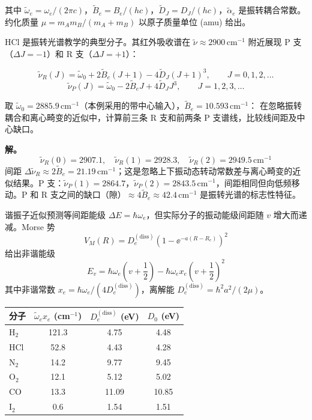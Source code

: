 其中 \(\tilde\omega_e=\omega_e/(2\pi c)\)，\(\tilde B_e=B_e/(hc)\)，\(\tilde D_J=D_J/(hc)\)，\(\tilde\alpha_e\) 是振转耦合常数。约化质量 \(\mu=m_Am_B/(m_A+m_B)\) 以原子质量单位 (amu) 给出。

HCl 是振转光谱教学的典型分子。其红外吸收谱在 \(\tilde\nu\approx2900\,\mathrm{cm}^{-1}\) 附近展现 P 支（\(\Delta J=-1\)）和 R 支（\(\Delta J=+1\)）：

\[
\tilde\nu_R(J)=\tilde\omega_0+2\tilde B_e(J+1)-4\tilde D_J(J+1)^3,\qquad J=0,1,2,\ldots
\]
\[
\tilde\nu_P(J)=\tilde\omega_0-2\tilde B_e J+4\tilde D_J J^3,\qquad J=1,2,3,\ldots
\]

\begin{exbox}
取 \(\tilde\omega_0=2885.9\,\mathrm{cm}^{-1}\)（本例采用的带中心输入），\(\tilde B_e=10.593\,\mathrm{cm}^{-1}\)：
在忽略振转耦合和离心畸变的近似中，计算前三条 R 支和前两条 P 支谱线，比较线间距及中心缺口。

\textbf{解。} \[
\tilde\nu_R(0)=2907.1,\quad\tilde\nu_R(1)=2928.3,\quad\tilde\nu_R(2)=2949.5\,\mathrm{cm}^{-1}
\]
间距 \(\Delta\tilde\nu_R\approx2\tilde B_e=21.19\,\mathrm{cm}^{-1}\)；这是忽略上下振动态转动常数差与离心畸变的近似结果。P 支：\(\tilde\nu_P(1)=2864.7\)，\(\tilde\nu_P(2)=2843.5\,\mathrm{cm}^{-1}\)，间距相同但向低频移动。P 和 R 支之间的缺口（隙）\(\approx4\tilde B_e\approx42.4\,\mathrm{cm}^{-1}\) 是振转光谱的标志性特征。
\end{exbox}

谐振子近似预测等间距能级 \(\Delta E=\hbar\omega_e\)，但实际分子的振动能级间距随 \(v\) 增大而递减。Morse 势
\[
V_M(R)=D_e^{(\mathrm{diss})}\left(1-\ee^{-a(R-R_e)}\right)^2
\]
给出非谐能级
\[
E_v=\hbar\omega_e\left(v+\frac12\right)-\hbar\omega_ex_e\left(v+\frac12\right)^2
\]
其中非谐常数 \(x_e=\hbar\omega_e/(4D_e^{(\mathrm{diss})})\)，离解能 \(D_e^{(\mathrm{diss})}=\hbar^2a^2/(2\mu)\)。

\begin{center}
\begin{tabular}{lccc}
\hline
分子 & \(\tilde\omega_ex_e\) (cm\(^{-1}\)) & \(D_e^{(\mathrm{diss})}\) (eV) & \(D_0\) (eV) \\
\hline
H\(_2\) & 121.3 & 4.75 & 4.48 \\
HCl & 52.8 & 4.43 & 4.28 \\
N\(_2\) & 14.2 & 9.77 & 9.45 \\
O\(_2\) & 12.1 & 5.12 & 5.02 \\
CO & 13.3 & 11.09 & 10.85 \\
I\(_2\) & 0.6 & 1.54 & 1.51 \\
\hline
\end{tabular}
\end{center}

